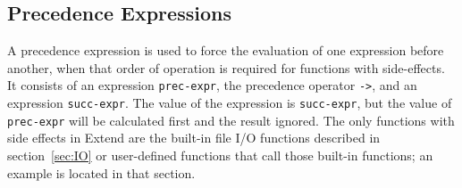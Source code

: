 \subsection{Precedence Expressions}
A precedence expression is used to force the evaluation of one expression before another, when that order of operation is required for functions with side-effects. It consists of an expression \texttt{prec-expr}, the precedence operator \texttt{->}, and an expression \texttt{succ-expr}. The value of the expression is \texttt{succ-expr}, but the value of \texttt{prec-expr} will be calculated first and the result ignored. The only functions with side effects in Extend are the built-in file I/O functions described in section~\ref{sec:IO} or user-defined functions that call those built-in functions; an example is located in that section.
